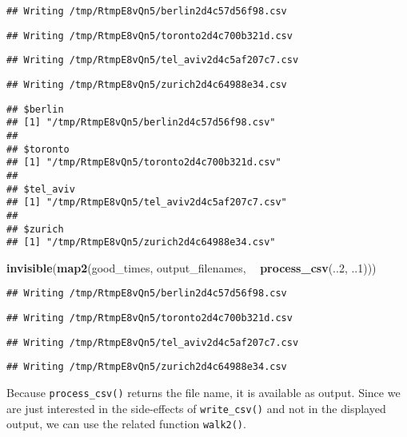 \documentclass[]{book}
\newenvironment{Shaded}{\begin{snugshade}}{\end{snugshade}}
\newcommand{\DecValTok}[1]{\textcolor[rgb]{0.00,0.00,0.81}{#1}}
\newcommand{\KeywordTok}[1]{\textcolor[rgb]{0.13,0.29,0.53}{\textbf{#1}}}
\newcommand{\NormalTok}[1]{#1}
\newcommand{\OperatorTok}[1]{\textcolor[rgb]{0.81,0.36,0.00}{\textbf{#1}}}
\newcommand{\StringTok}[1]{\textcolor[rgb]{0.31,0.60,0.02}{#1}}
\begin{document}
\begin{verbatim}
## Writing /tmp/RtmpE8vQn5/berlin2d4c57d56f98.csv
\end{verbatim}

\begin{verbatim}
## Writing /tmp/RtmpE8vQn5/toronto2d4c700b321d.csv
\end{verbatim}

\begin{verbatim}
## Writing /tmp/RtmpE8vQn5/tel_aviv2d4c5af207c7.csv
\end{verbatim}

\begin{verbatim}
## Writing /tmp/RtmpE8vQn5/zurich2d4c64988e34.csv
\end{verbatim}

\begin{verbatim}
## $berlin
## [1] "/tmp/RtmpE8vQn5/berlin2d4c57d56f98.csv"
## 
## $toronto
## [1] "/tmp/RtmpE8vQn5/toronto2d4c700b321d.csv"
## 
## $tel_aviv
## [1] "/tmp/RtmpE8vQn5/tel_aviv2d4c5af207c7.csv"
## 
## $zurich
## [1] "/tmp/RtmpE8vQn5/zurich2d4c64988e34.csv"
\end{verbatim}

\begin{Shaded}
\begin{Highlighting}[]
\KeywordTok{invisible}\NormalTok{(}\KeywordTok{map2}\NormalTok{(good_times, output_filenames, }\OperatorTok{~}\StringTok{ }\KeywordTok{process_csv}\NormalTok{(..}\DecValTok{2}\NormalTok{, ..}\DecValTok{1}\NormalTok{)))}
\end{Highlighting}
\end{Shaded}

\begin{verbatim}
## Writing /tmp/RtmpE8vQn5/berlin2d4c57d56f98.csv
\end{verbatim}

\begin{verbatim}
## Writing /tmp/RtmpE8vQn5/toronto2d4c700b321d.csv
\end{verbatim}

\begin{verbatim}
## Writing /tmp/RtmpE8vQn5/tel_aviv2d4c5af207c7.csv
\end{verbatim}

\begin{verbatim}
## Writing /tmp/RtmpE8vQn5/zurich2d4c64988e34.csv
\end{verbatim}

Because \texttt{process\_csv()} returns the file name, it is available as output.
Since we are just interested in the side-effects of \texttt{write\_csv()} and not in the displayed output, we can use the related function \texttt{walk2()}.
\end{document}
